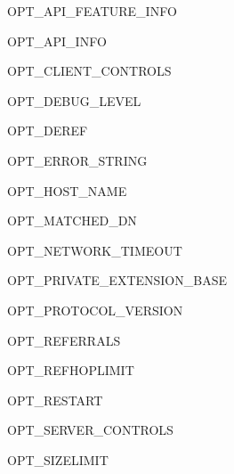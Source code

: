 \begin{datadesc}{OPT_API_FEATURE_INFO}
\end{datadesc}

\begin{datadesc}{OPT_API_INFO}
\end{datadesc}

\begin{datadesc}{OPT_CLIENT_CONTROLS}
\end{datadesc}

\begin{datadesc}{OPT_DEBUG_LEVEL}
\end{datadesc}

\begin{datadesc}{OPT_DEREF}
\end{datadesc}

\begin{datadesc}{OPT_ERROR_STRING}
\end{datadesc}

\begin{datadesc}{OPT_HOST_NAME}
\end{datadesc}

\begin{datadesc}{OPT_MATCHED_DN}
\end{datadesc}

\begin{datadesc}{OPT_NETWORK_TIMEOUT}
\end{datadesc}

\begin{datadesc}{OPT_PRIVATE_EXTENSION_BASE}
\end{datadesc}

\begin{datadesc}{OPT_PROTOCOL_VERSION}
\end{datadesc}

\begin{datadesc}{OPT_REFERRALS}
\end{datadesc}

\begin{datadesc}{OPT_REFHOPLIMIT}
\end{datadesc}

\begin{datadesc}{OPT_RESTART}
\end{datadesc}

\begin{datadesc}{OPT_SERVER_CONTROLS}
\end{datadesc}

\begin{datadesc}{OPT_SIZELIMIT}
\end{datadesc}

